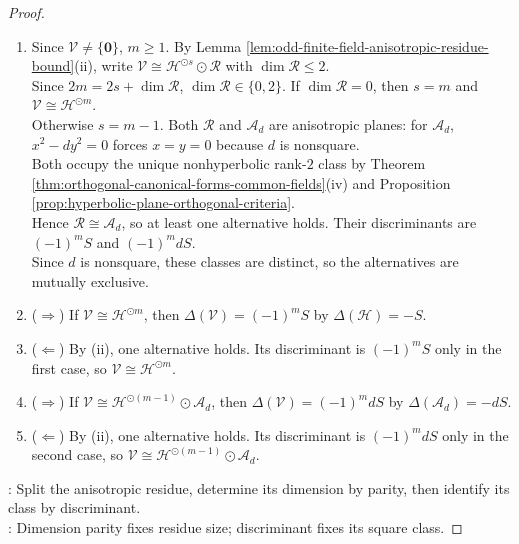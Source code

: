 \begin{theorem}
\begin{proof}
\begin{enumerate}[label=(\roman*)]
Since $2m+1=2s+\dim\mathcal{R}$, parity implies $\dim\mathcal{R}=1$ and $s=m$. Choose $a\in\mathbb{F}_q^{\times}$ with $\mathcal{R}\cong\langle a\rangle$.\\
Since $\Delta(\mathcal{H})=-S$, $\Delta(\mathcal{V})=(-1)^maS$, and hence $aS=(-1)^m\Delta(\mathcal{V})$.
\item[$(ii)$] Since $\mathcal{V}\neq\{\mathbf{0}\}$, $m\geq1$. By Lemma \ref{lem:odd-finite-field-anisotropic-residue-bound}(ii), write $\mathcal{V}\cong\mathcal{H}^{\odot s}\odot\mathcal{R}$ with $\dim\mathcal{R}\leq2$.\\
Since $2m=2s+\dim\mathcal{R}$, $\dim\mathcal{R}\in\{0,2\}$. If $\dim\mathcal{R}=0$, then $s=m$ and $\mathcal{V}\cong\mathcal{H}^{\odot m}$.\\
Otherwise $s=m-1$. Both $\mathcal{R}$ and $\mathcal{A}_d$ are anisotropic planes: for $\mathcal{A}_d$, $x^2-dy^2=0$ forces $x=y=0$ because $d$ is nonsquare.\\
Both occupy the unique nonhyperbolic rank-$2$ class by Theorem \ref{thm:orthogonal-canonical-forms-common-fields}(iv) and Proposition \ref{prop:hyperbolic-plane-orthogonal-criteria}.\\
Hence $\mathcal{R}\cong\mathcal{A}_d$, so at least one alternative holds. Their discriminants are $(-1)^mS$ and $(-1)^mdS$.\\
Since $d$ is nonsquare, these classes are distinct, so the alternatives are mutually exclusive.
\item[$(iii)$] ($\Rightarrow$) If $\mathcal{V}\cong\mathcal{H}^{\odot m}$, then $\Delta(\mathcal{V})=(-1)^mS$ by $\Delta(\mathcal{H})=-S$.
\item[$(iii)$] ($\Leftarrow$) By (ii), one alternative holds. Its discriminant is $(-1)^mS$ only in the first case, so $\mathcal{V}\cong\mathcal{H}^{\odot m}$.
\item[$(iv)$] ($\Rightarrow$) If $\mathcal{V}\cong\mathcal{H}^{\odot(m-1)}\odot\mathcal{A}_d$, then $\Delta(\mathcal{V})=(-1)^mdS$ by $\Delta(\mathcal{A}_d)=-dS$.
\item[$(iv)$] ($\Leftarrow$) By (ii), one alternative holds. Its discriminant is $(-1)^mdS$ only in the second case, so $\mathcal{V}\cong\mathcal{H}^{\odot(m-1)}\odot\mathcal{A}_d$.
\end{enumerate}
: Split the anisotropic residue, determine its dimension by parity, then identify its class by discriminant.\\
: Dimension parity fixes residue size; discriminant fixes its square class.
\end{proof}
\end{theorem}
